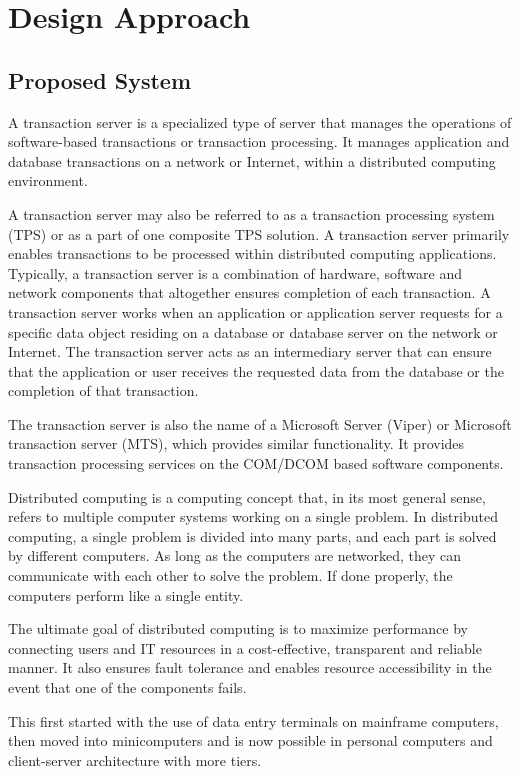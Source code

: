 \chapter{Design Approach}
\section{Proposed System}
A transaction server is a specialized type of server that manages the operations of software-based transactions or transaction processing. It manages application and database transactions on a network or Internet, within a distributed computing environment.
\par
A transaction server may also be referred to as a transaction processing system (TPS) or as a part of one composite TPS solution. A transaction server primarily enables transactions to be processed within distributed computing applications. Typically, a transaction server is a combination of hardware, software and network components that altogether ensures completion of each transaction. A transaction server works when an application or application server requests for a specific data object residing on a database or database server on the network or Internet. The transaction server acts as an intermediary server that can ensure that the application or user receives the requested data from the database or the completion of that transaction.
\par
The transaction server is also the name of a Microsoft Server (Viper) or Microsoft transaction server (MTS), which provides similar functionality. It provides transaction processing services on the COM/DCOM based software components.
\par
Distributed computing is a computing concept that, in its most general sense, refers to multiple computer systems working on a single problem. In distributed computing, a single problem is divided into many parts, and each part is solved by different computers. As long as the computers are networked, they can communicate with each other to solve the problem. If done properly, the computers perform like a single entity.
\par
The ultimate goal of distributed computing is to maximize performance by connecting users and IT resources in a cost-effective, transparent and reliable manner. It also ensures fault tolerance and enables resource accessibility in the event that one of the components fails.
\par
This first started with the use of data entry terminals on mainframe computers, then moved into minicomputers and is now possible in personal computers and client-server architecture with more tiers.
